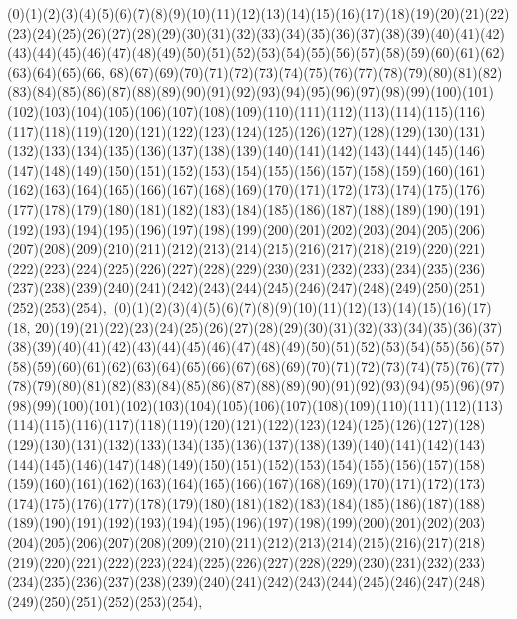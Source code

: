 \documentclass[12pt]{article}
\begin{document}
{(0)(1)(2)(3)(4)(5)(6)(7)(8)(9)(10)(11)(12)(13)(14)(15)(16)(17)(18)(19)(20)(21)(22)(23)(24)(25)(26)(27)(28)(29)(30)(31)(32)(33)(34)(35)(36)(37)(38)(39)(40)(41)(42)(43)(44)(45)(46)(47)(48)(49)(50)(51)(52)(53)(54)(55)(56)(57)(58)(59)(60)(61)(62)(63)(64)(65)(66, 68)(67)(69)(70)(71)(72)(73)(74)(75)(76)(77)(78)(79)(80)(81)(82)(83)(84)(85)(86)(87)(88)(89)(90)(91)(92)(93)(94)(95)(96)(97)(98)(99)(100)(101)(102)(103)(104)(105)(106)(107)(108)(109)(110)(111)(112)(113)(114)(115)(116)(117)(118)(119)(120)(121)(122)(123)(124)(125)(126)(127)(128)(129)(130)(131)(132)(133)(134)(135)(136)(137)(138)(139)(140)(141)(142)(143)(144)(145)(146)(147)(148)(149)(150)(151)(152)(153)(154)(155)(156)(157)(158)(159)(160)(161)(162)(163)(164)(165)(166)(167)(168)(169)(170)(171)(172)(173)(174)(175)(176)(177)(178)(179)(180)(181)(182)(183)(184)(185)(186)(187)(188)(189)(190)(191)(192)(193)(194)(195)(196)(197)(198)(199)(200)(201)(202)(203)(204)(205)(206)(207)(208)(209)(210)(211)(212)(213)(214)(215)(216)(217)(218)(219)(220)(221)(222)(223)(224)(225)(226)(227)(228)(229)(230)(231)(232)(233)(234)(235)(236)(237)(238)(239)(240)(241)(242)(243)(244)(245)(246)(247)(248)(249)(250)(251)(252)(253)(254)$
, 
$
(0)(1)(2)(3)(4)(5)(6)(7)(8)(9)(10)(11)(12)(13)(14)(15)(16)(17)(18, 20)(19)(21)(22)(23)(24)(25)(26)(27)(28)(29)(30)(31)(32)(33)(34)(35)(36)(37)(38)(39)(40)(41)(42)(43)(44)(45)(46)(47)(48)(49)(50)(51)(52)(53)(54)(55)(56)(57)(58)(59)(60)(61)(62)(63)(64)(65)(66)(67)(68)(69)(70)(71)(72)(73)(74)(75)(76)(77)(78)(79)(80)(81)(82)(83)(84)(85)(86)(87)(88)(89)(90)(91)(92)(93)(94)(95)(96)(97)(98)(99)(100)(101)(102)(103)(104)(105)(106)(107)(108)(109)(110)(111)(112)(113)(114)(115)(116)(117)(118)(119)(120)(121)(122)(123)(124)(125)(126)(127)(128)(129)(130)(131)(132)(133)(134)(135)(136)(137)(138)(139)(140)(141)(142)(143)(144)(145)(146)(147)(148)(149)(150)(151)(152)(153)(154)(155)(156)(157)(158)(159)(160)(161)(162)(163)(164)(165)(166)(167)(168)(169)(170)(171)(172)(173)(174)(175)(176)(177)(178)(179)(180)(181)(182)(183)(184)(185)(186)(187)(188)(189)(190)(191)(192)(193)(194)(195)(196)(197)(198)(199)(200)(201)(202)(203)(204)(205)(206)(207)(208)(209)(210)(211)(212)(213)(214)(215)(216)(217)(218)(219)(220)(221)(222)(223)(224)(225)(226)(227)(228)(229)(230)(231)(232)(233)(234)(235)(236)(237)(238)(239)(240)(241)(242)(243)(244)(245)(246)(247)(248)(249)(250)(251)(252)(253)(254)$
, 
$
}
\end{document}
